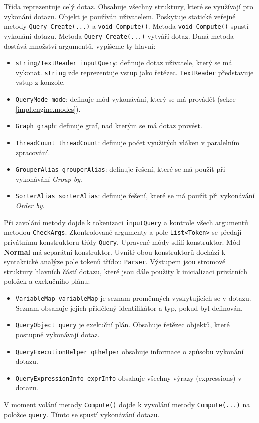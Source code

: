 Třída reprezentuje celý dotaz.
Obsahuje všechny struktury, které se využívají pro vykonání dotazu.
Objekt je používán uživatelem.
Poskytuje statické veřejné metody \texttt{Query Create(...)} a \texttt{void Compute()}.
Metoda \texttt{void Compute()} spustí vykonání dotazu.
Metoda \texttt{Query Create(...)} vytváří dotaz.
Daná metoda dostává množství argumentů, vypíšeme ty hlavní:
\begin{itemize}
\item \texttt{string/TextReader inputQuery}: definuje dotaz uživatele, který se má vykonat. \texttt{string} zde reprezentuje vstup jako řetězec. \texttt{TextReader} představuje vstup z konzole.
\item \texttt{QueryMode mode}: definuje mód vykonávání, který se má provádět (sekce \ref{impl.engine.modes}).
\item \texttt{Graph graph}: definuje graf, nad kterým se má dotaz provést.
\item \texttt{ThreadCount threadCount}: definuje počet využitých vláken v paralelním zpracování.
\item \texttt{GrouperAlias grouperAlias}: definuje řešení, které se má použít při vykonávání \textit{Group by}.
\item \texttt{SorterAlias sorterAlias}: definuje řešení, které se má použít při vykonávání \textit{Order by}.
\end{itemize}
Při zavolání metody dojde k tokenizaci \texttt{inputQuery} a kontrole všech argumentů metodou \texttt{CheckArgs}.
Zkontrolované argumenty a pole \texttt{List<Token>} se předají privátnímu konstruktoru třídy \texttt{Query}.
Upravené módy sdílí konstruktor. Mód \textbf{Normal} má separátní konstruktor.
Uvnitř obou konstruktorů dochází k syntaktické analýze pole tokenů třídou \texttt{Parser}.
Výstupem jsou stromové struktury hlavních částí dotazu, které jsou dále použity k inicializaci privátních položek a exekučního plánu:
\begin{itemize}
\item \texttt{VariableMap variableMap} je seznam proměnných vyskytujících se v dotazu. Seznam obsahuje jejich přidělený identifikátor a typ, pokud byl definován.
\item \texttt{QueryObject query} je exekuční plán. Obsahuje řetězec objektů, které postupně vykonávají dotaz.
\item \texttt{QueryExecutionHelper qEhelper} obsahuje informace o způsobu vykonání dotazu. 
\item \texttt{QueryExpressionInfo exprInfo} obsahuje všechny výrazy (expressions) v dotazu.
\end{itemize}
V moment volání metody \texttt{Compute()} dojde k vyvolání metody \texttt{Compute(...)} na položce \texttt{query}.
Tímto se spustí vykonávání dotazu.

